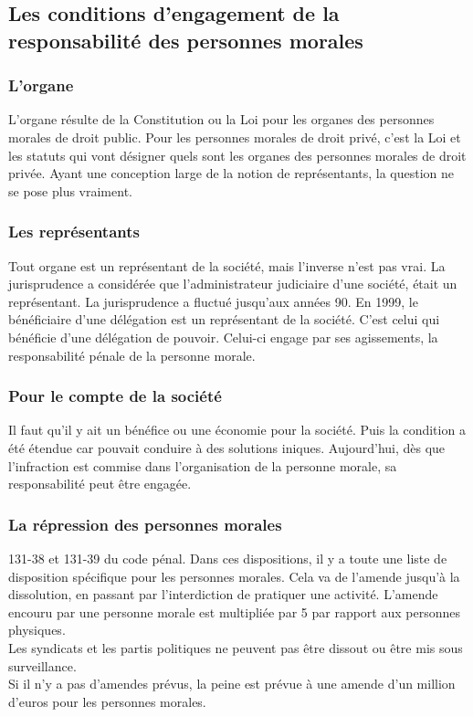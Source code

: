\documentclass[10pt, a4paper, openany]{book}
\begin{document}
\subsection{Les conditions d'engagement de la responsabilité des personnes morales}


\subsubsection{L'organe}

L'organe résulte de la Constitution ou la Loi pour les organes des personnes morales de droit public. Pour les personnes morales de droit privé, c'est la Loi et les statuts qui vont désigner quels sont les organes des personnes morales de droit privée. Ayant une conception large de la notion de représentants, la question ne se pose plus vraiment.

\subsubsection{Les représentants}

Tout organe est un représentant de la société, mais l'inverse n'est pas vrai. La jurisprudence a considérée que l'administrateur judiciaire d'une société, était un représentant. La jurisprudence a fluctué jusqu'aux années 90. En 1999, le bénéficiaire d'une délégation est un représentant de la société. C'est celui qui bénéficie d'une délégation de pouvoir. Celui-ci engage par ses agissements, la responsabilité pénale de la personne morale.

\subsubsection{Pour le compte de la société}

Il faut qu'il y ait un bénéfice ou une économie pour la société. Puis la condition a été étendue car pouvait conduire à des solutions iniques. Aujourd'hui, dès que l'infraction est commise dans l'organisation de la personne morale, sa responsabilité peut être engagée. 

\subsubsection{La répression des personnes morales}

131-38 et 131-39 du code pénal. Dans ces dispositions, il y a toute une liste de disposition spécifique pour les personnes morales. Cela va de l'amende jusqu'à la dissolution, en passant par l'interdiction de pratiquer une activité. L'amende encouru par une personne morale est multipliée par 5 par rapport aux personnes physiques. \\
Les syndicats et les partis politiques ne peuvent pas être dissout ou être mis sous surveillance. \\
Si il n'y a pas d'amendes prévus, la peine est prévue à une amende d'un million d'euros pour les personnes morales. 
\end{document}
